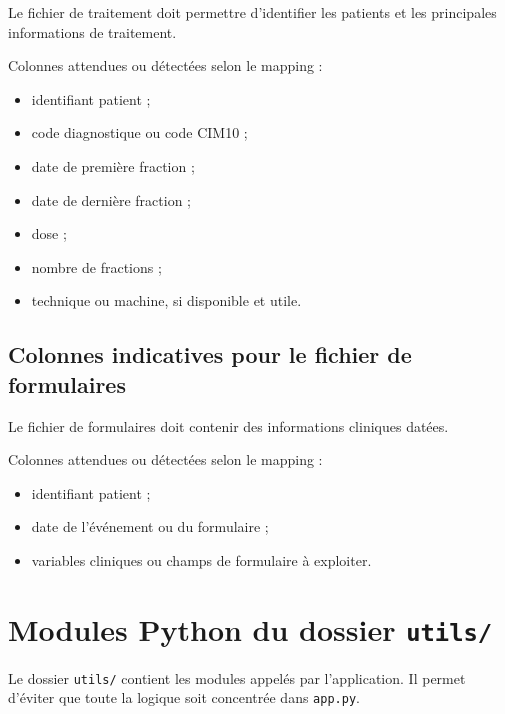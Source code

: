 \documentclass[11pt,a4paper]{article}
\newcommand{\code}[1]{\texttt{#1}}
\begin{document}
Le fichier de traitement doit permettre d'identifier les patients et les principales informations de traitement.

Colonnes attendues ou détectées selon le mapping :
\begin{itemize}
  \item identifiant patient ;
  \item code diagnostique ou code CIM10 ;
  \item date de première fraction ;
  \item date de dernière fraction ;
  \item dose ;
  \item nombre de fractions ;
  \item technique ou machine, si disponible et utile.
\end{itemize}

\subsection{Colonnes indicatives pour le fichier de formulaires}

Le fichier de formulaires doit contenir des informations cliniques datées.

Colonnes attendues ou détectées selon le mapping :
\begin{itemize}
  \item identifiant patient ;
  \item date de l'événement ou du formulaire ;
  \item variables cliniques ou champs de formulaire à exploiter.
\end{itemize}

\section{Modules Python du dossier \code{utils/}}

Le dossier \code{utils/} contient les modules appelés par l'application. Il permet d'éviter que toute la logique soit concentrée dans \code{app.py}.
\end{document}
